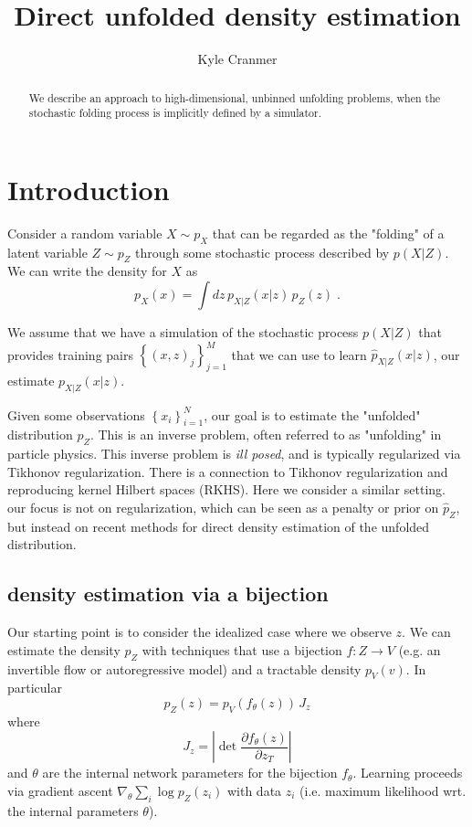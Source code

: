 \documentclass[a4paper]{article}
\title{Direct unfolded density estimation}
\author{Kyle Cranmer}
\begin{document}
\maketitle

\begin{abstract}
We describe an approach to high-dimensional, unbinned unfolding problems, when the stochastic folding process is implicitly defined by a simulator.
\end{abstract}

\section{Introduction}

Consider a random variable $X \sim p_{X}$ that can be regarded as the   "folding" of  a latent variable  $Z \sim p_{Z}$ through some  stochastic process  described by $p(X|Z)$.  We can write the density for $X$ as
\begin{equation}\label{eq:px}
p_{X}(x) = \int dz \, p_{X|Z}(x|z)\, p_{Z}(z) \; .
\end{equation}

We assume that we have a simulation of the stochastic process $p(X|Z)$ that provides training pairs $\left \{ (x,z)_j \right\}_{j=1}^{M}$ that we can use to learn $\hat{p}_{X|Z}(x|z)$, our estimate $p_{X|Z}(x|z)$.  

Given some observations $\left\{ x_i \right\}_{i=1}^{N}$, our goal is to estimate the "unfolded" distribution $p_{Z}$. This is an inverse problem, often referred to as "unfolding" in particle physics.  This inverse  problem is  \textit{ill posed}, and is typically regularized via  Tikhonov regularization. There is a connection to Tikhonov regularization and reproducing kernel Hilbert spaces (RKHS). Here we consider a similar setting. our focus is not on regularization, which can be seen as a penalty or prior on $\hat{p}_Z$, but instead  on recent methods for direct density estimation of the unfolded distribution.  

\subsection{density estimation via a bijection}

Our starting point is to consider the idealized case where we observe $z$. We can estimate the density $p_Z$ with  techniques that use a bijection $f:Z\to V$ (e.g. an invertible flow or autoregressive model) and a tractable density $p_V(v)$.  In particular 
\begin{equation}
p_{Z}(z) =  p_V(f_{\theta}(z))\, J_{z}
\end{equation}
where
\begin{equation}
\label{eq:jacJz}
J_{z} =  \left| \det \frac{\partial f_{\theta}(z)}{\partial {z}_T} \right|
\end{equation}
and $\theta$ are the internal network parameters for the bijection $f_\theta$. Learning proceeds via gradient ascent $\nabla_\theta \sum_i \log p_{Z}(z_i)$ with data $z_i$  (i.e. maximum likelihood wrt. the internal parameters $\theta$). 
\end{document}
